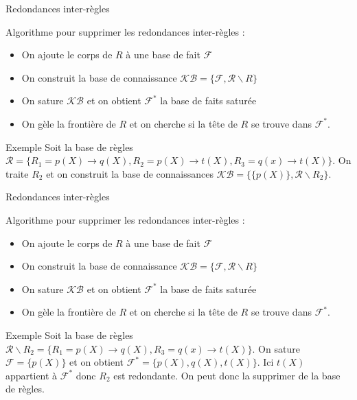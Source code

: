 \begin{frame}{Redondances inter-règles}
   
   Algorithme pour supprimer les redondances inter-règles :
    
    \begin{itemize}
        \color{red}
        \item On ajoute le corps de $R$ à une base de fait $\mathcal{F}$
        \item On construit la base de connaissance $\mathcal{KB} = \{\mathcal{F}, \mathcal{R} \backslash R \}$
        \color{black}
        \item On sature $\mathcal{KB}$ et on obtient $\mathcal{F}^*$ la base de faits saturée
        \item On gèle la frontière de $R$ et on cherche si la tête de $R$ se trouve dans $\mathcal{F}^*$.
    \end{itemize}
    
    \begin{block}{Exemple}
          Soit la base de règles $\mathcal{R} = \{ R_1 = p(X) \xrightarrow{} q(X), R_2 = p(X) \xrightarrow{} t(X), R_3 = q(x) \xrightarrow{} t(X)\}$. On traite $R_2$ et on construit la base de connaissances $\mathcal{KB} = \{ \{p(X)\}, \mathcal{R} \backslash R_2\}$.
    \end{block}
    
\end{frame}

\begin{frame}{Redondances inter-règles}
   
  Algorithme pour supprimer les redondances inter-règles :
    
    \begin{itemize}
        \item On ajoute le corps de $R$ à une base de fait $\mathcal{F}$
        \item On construit la base de connaissance $\mathcal{KB} = \{\mathcal{F}, \mathcal{R} \backslash R \}$
        \color{red}
        \item On sature $\mathcal{KB}$ et on obtient $\mathcal{F}^*$ la base de faits saturée
        \item On gèle la frontière de $R$ et on cherche si la tête de $R$ se trouve dans $\mathcal{F}^*$.
        \color{black}
    \end{itemize}
    
    \begin{block}{Exemple}
          Soit la base de règles $\mathcal{R} \backslash R_2 = \{ R_1 = p(X) \xrightarrow{} q(X), R_3 = q(x) \xrightarrow{} t(X)\}$. On sature $\mathcal{F} = \{p(X)\}$ et on obtient $\mathcal{F}^* = \{p(X), q(X), t(X)\}$. Ici $t(X)$ appartient à $\mathcal{F}^*$ donc $R_2$ est redondante. On peut donc la supprimer de la base de règles.
    \end{block}
    
\end{frame}


